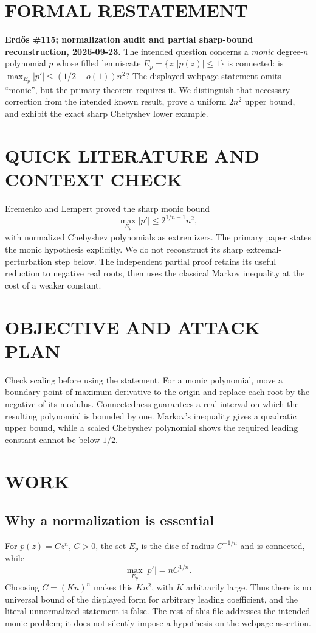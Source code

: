 \section{FORMAL RESTATEMENT}
\textbf{Erd\H{o}s \#115; normalization audit and partial sharp-bound reconstruction, 2026-09-23.}
The intended question concerns a \emph{monic} degree-$n$ polynomial $p$ whose filled lemniscate $E_p=\{z:|p(z)|\leq1\}$ is connected: is $\max_{E_p}|p'|\leq(1/2+o(1))n^2$? The displayed webpage statement omits ``monic'', but the primary theorem requires it. We distinguish that necessary correction from the intended known result, prove a uniform $2n^2$ upper bound, and exhibit the exact sharp Chebyshev lower example.

\section{QUICK LITERATURE AND CONTEXT CHECK}
Eremenko and Lempert proved the sharp monic bound
\[
\max_{E_p}|p'|\leq 2^{1/n-1}n^2,
\tag{1}
\]
with normalized Chebyshev polynomials as extremizers. The primary paper states the monic hypothesis explicitly. We do not reconstruct its sharp extremal-perturbation step below. The independent partial proof retains its useful reduction to negative real roots, then uses the classical Markov inequality at the cost of a weaker constant.

\section{OBJECTIVE AND ATTACK PLAN}
Check scaling before using the statement. For a monic polynomial, move a boundary point of maximum derivative to the origin and replace each root by the negative of its modulus. Connectedness guarantees a real interval on which the resulting polynomial is bounded by one. Markov's inequality gives a quadratic upper bound, while a scaled Chebyshev polynomial shows the required leading constant cannot be below $1/2$.

\section{WORK}
\subsection{Why a normalization is essential}
For $p(z)=Cz^n$, $C>0$, the set $E_p$ is the disc of radius $C^{-1/n}$ and is connected, while
\[
\max_{E_p}|p'|=nC^{1/n}.
\]
Choosing $C=(Kn)^n$ makes this $Kn^2$, with $K$ arbitrarily large. Thus there is no universal bound of the displayed form for arbitrary leading coefficient, and the literal unnormalized statement is false. The rest of this file addresses the intended monic problem; it does not silently impose a hypothesis on the webpage assertion.

